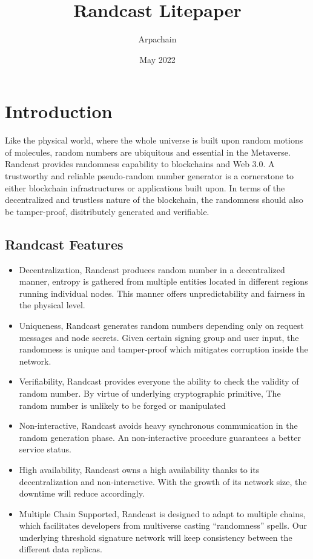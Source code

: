 \documentclass[11pt]{article}
\title{Randcast Litepaper}
\author{Arpachain}
\date{May 2022}
\begin{document}
\maketitle

\section{Introduction}

Like the physical world, where the whole universe is built upon random motions of molecules, random numbers are ubiquitous and essential in the Metaverse. Randcast provides randomness capability to blockchains and Web 3.0. A trustworthy and reliable pseudo-random number generator is a cornerstone to either blockchain infrastructures or applications built upon. In terms of the decentralized and trustless nature of the blockchain, the randomness should also be tamper-proof, disitributely generated and verifiable. 

\subsection{Randcast Features}
\begin{itemize}
    \item Decentralization, Randcast produces random number in a decentralized manner, entropy is gathered from multiple entities located in different regions running individual nodes. This manner offers unpredictability and fairness in the physical level.
    \item Uniqueness, Randcast generates random numbers depending only on request messages and node secrets. Given certain signing group and user input, the randomness is unique and tamper-proof which mitigates corruption inside the network.
    \item Verifiability, Randcast provides everyone the ability to check the validity of random number. By virtue of underlying cryptographic primitive, The random number is unlikely to be forged or manipulated
    \item Non-interactive, Randcast avoids heavy synchronous communication in the random generation phase. An non-interactive procedure guarantees a better service status.
    \item High availability, Randcast owns a high availability thanks to its decentralization and non-interactive. With the growth of its network size, the downtime will reduce accordingly.
    \item Multiple Chain Supported, Randcast is designed to adapt to multiple chains, which facilitates developers from multiverse casting “randomness” spells. Our underlying threshold signature network will keep consistency between the different data replicas.
\end{itemize}
\end{document}
